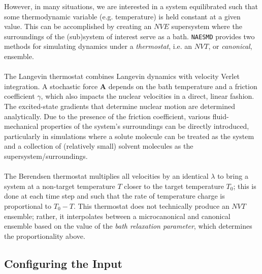 \documentclass[12pt,letter,footinclude=true,headinclude=true,hyphens]{book} %
\begin{document}
    However, in many situations, we are interested in a system equilibrated such that some thermodynamic variable (e.g. temperature) is held constant at a given value. This can be accomplished by creating an $NVE$ supersystem where the surroundings of the (sub)system of interest serve as a bath. \texttt{NAESMD} provides two methods for simulating dynamics under a \emph{thermostat}, i.e. an $NVT$, or \emph{canonical}, ensemble. \\ \\
    The Langevin thermostat combines Langevin dynamics with velocity Verlet integration. A stochastic force $\mathbf{A}$ depends on the bath temperature and a friction coefficient $\gamma$, which also impacts the nuclear velocities in a direct, linear fashion. The excited-state gradients that determine nuclear motion are determined analytically. Due to the presence of the friction coefficient, various fluid-mechanical properties of the system's surroundings can be directly introduced, particularly in simulations where a solute molecule can be treated as the system and a collection of (relatively small) solvent molecules as the supersystem/surroundings. \\ \\
    The Berendsen thermostat multiplies all velocities by an identical $\lambda$ to bring a system at a non-target temperature $T$ closer to the target temperature $T_0$; this is done at each time step and such that the rate of temperature charge is proportional to $T_0 - T$. This thermostat does not technically produce an $NVT$ ensemble; rather, it interpolates between a microcanonical and canonical ensemble based on the value of the \emph{bath relaxation parameter}, which determines the proportionality above.   
    
    \subsection{Configuring the Input}
    \label{thermo-input}
    
\end{document}
